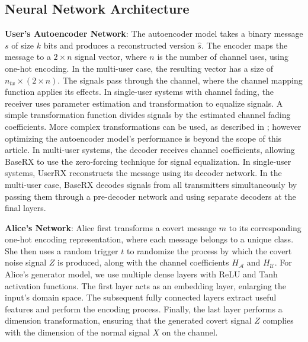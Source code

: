 \subsection{Neural Network Architecture}
\textbf{User's Autoencoder Network}: The autoencoder model takes a binary message \(s\) of size \(k\) bits and produces a reconstructed version \(\hat{s}\). The encoder maps the message to a \(2 \times n\) signal vector, where \(n\) is the number of channel uses, using one-hot encoding. In the multi-user case, the resulting vector has a size of \(n_{tx} \times (2 \times n)\). The signals pass through the channel, where the channel mapping function applies its effects. In single-user systems with channel fading, the receiver uses parameter estimation and transformation to equalize signals. A simple transformation function divides signals by the estimated channel fading coefficients. More complex transformations can be used, as described in \cite{o2017introduction}; however optimizing the autoencoder model's performance is beyond the scope of this article. In multi-user systems, the decoder receives channel coefficients, allowing BaseRX to use the zero-forcing technique \cite{garg2010wireless} for signal equalization. In single-user systems, UserRX reconstructs the message using its decoder network. In the multi-user case, BaseRX decodes signals from all transmitters simultaneously by passing them through a pre-decoder network and using separate decoders at the final layers.


\textbf{Alice's Network}: Alice first transforms a covert message \(m\) to its corresponding one-hot encoding representation, where each message belongs to a unique class. She then uses a random trigger \(t\) to randomize the process by which the covert noise signal \(Z\) is produced, along with the channel coefficients \(H_{\mathcal{A}}\) and \(H_{\mathcal{U}}\). For Alice's generator model, we use multiple dense layers with ReLU and Tanh activation functions. The first layer acts as an embedding layer, enlarging the input's domain space. The subsequent fully connected layers extract useful features and perform the encoding process. Finally, the last layer performs a dimension transformation, ensuring that the generated covert signal \(Z\) complies with the dimension of the normal signal \(X\) on the channel. 



